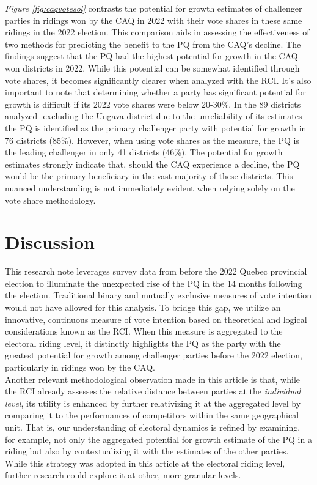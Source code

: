 \documentclass[
  journal=medium,
  manuscript=article-type,
  year=2024
]{cup-journal}
\begin{document}
\textit{Figure \ref{fig:caqvotesol}} contrasts the potential for growth estimates of challenger parties in ridings won by the CAQ in 2022 with their vote shares in these same ridings in the 2022 election. This comparison aids in assessing the effectiveness of two methods for predicting the benefit to the PQ from the CAQ's decline. The findings suggest that the PQ had the highest potential for growth in the CAQ-won districts in 2022. While this potential can be somewhat identified through vote shares, it becomes significantly clearer when analyzed with the RCI. It's also important to note that determining whether a party has significant potential for growth is difficult if its 2022 vote shares were below 20-30\%. In the 89 districts analyzed -excluding the Ungava district due to the unreliability of its estimates- the PQ is identified as the primary challenger party with potential for growth in 76 districts (85\%). However, when using vote shares as the measure, the PQ is the leading challenger in only 41 districts (46\%). The potential for growth estimates strongly indicate that, should the CAQ experience a decline, the PQ would be the primary beneficiary in the vast majority of these districts. This nuanced understanding is not immediately evident when relying solely on the vote share methodology.

\section{Discussion}

This research note leverages survey data from before the 2022 Quebec provincial election to illuminate the unexpected rise of the PQ in the 14 months following the election. Traditional binary and mutually exclusive measures of vote intention would not have allowed for this analysis. To bridge this gap, we utilize an innovative, continuous measure of vote intention based on theoretical and logical considerations known as the RCI. When this measure is aggregated to the electoral riding level, it distinctly highlights the PQ as the party with the greatest potential for growth among challenger parties before the 2022 election, particularly in ridings won by the CAQ. \\

Another relevant methodological observation made in this article is that, while the RCI already assesses the relative distance between parties at the \textit{individual level}, its utility is enhanced by further relativizing it at the aggregated level by comparing it to the performances of competitors within the same geographical unit. That is, our understanding of electoral dynamics is refined by examining, for example, not only the aggregated potential for growth estimate of the PQ in a riding but also by contextualizing it with the estimates of the other parties. While this strategy was adopted in this article at the electoral riding level, further research could explore it at other, more granular levels. \\
\end{document}
